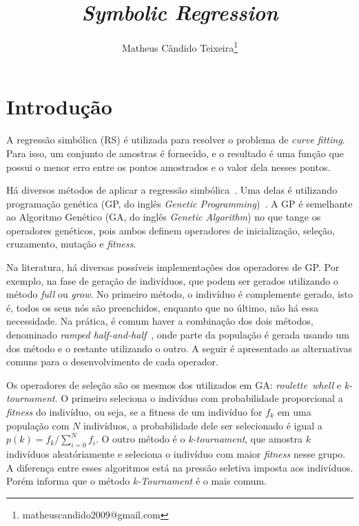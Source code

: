 \documentclass[a4paper]{article}
\begin{document}
\title{{\itshape Symbolic Regression}}
\author{Matheus Cândido Teixeira\thanks{matheuscandido2009@gmail.com}}
\maketitle

\section{Introdução}
A regressão simbólica (RS) é utilizada para resolver o problema de \emph{curve
fitting}. Para isso, um conjunto de amostras é fornecido, e o resultado é uma
função que possui o menor erro entre os pontos amostrados e o valor dela nesses
pontos.

Há diversos métodos de aplicar a regressão simbólica~\citep{jin2019}. Uma delas
é utilizando programação genética (GP, do inglês \textit{Genetic
  Programming})~\citep{poli2008}.  A GP é semelhante ao Algoritmo Genético (GA,
do inglês \textit{Genetic Algorithm}) no que tange os operadores genéticos, pois
ambos definem operadores de inicialização, seleção, cruzamento, mutação e
\textit{fitness}.

Na literatura, há diversas possíveis implementações dos operadores de GP. Por
exemplo, na fase de geração de indivíduos, que podem ser gerados utilizando o
método \textit{full} ou \textit{grow}. No primeiro método, o indivíduo é
complemente gerado, isto é, todos os seus nós são preenchidos, enquanto que no
último, não há essa necessidade. Na prática, é comum haver a combinação dos dois
métodos, denominado \textit{ramped half-and-half}~\citep{poli2008}, onde parte
da população é gerada usando um dos método e o restante utilizando o outro. A
seguir é apresentado as alternativas comuns para o desenvolvimento de cada
operador.

Os operadores de seleção são os mesmos dos utilizados em GA:
\textit{roulette~whell} e \textit{k-tournament}. O primeiro seleciona o
indivíduo com probabilidade proporcional a \textit{fitness} do indivíduo, ou
seja, se a fitness de um indivíduo for \emph{$f_k$} em uma população com $N$
indivíduos, a probabilidade dele ser selecionado é igual a $p(k) =
f_k/\sum_{i=0}^{N}f_i$. O outro método é o \textit{k-tournament}, que amostra
$k$ indivíduos aleatóriamente e seleciona o indivíduo com maior \textit{fitness}
nesse grupo. A diferença entre esses algoritmos está na pressão seletiva imposta
aos indivíduos. Porém \citet{poli2008} informa que o método
\textit{k-Tournament} é o mais comum.
\end{document}
